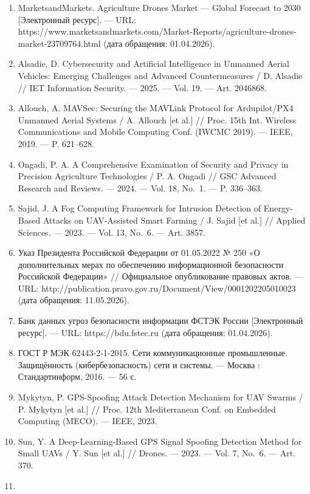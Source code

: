 \begin{enumerate}
\def\labelenumi{\arabic{enumi}.}
\item
  MarketsandMarkets. Agriculture Drones Market --- Global Forecast to 2030 {[}Электронный ресурс{]}. --- URL: https://www.marketsandmarkets.com/Market-Reports/agriculture-drones-market-23709764.html (дата обращения: 01.04.2026).
\item
  Alsadie, D. Cybersecurity and Artificial Intelligence in Unmanned Aerial Vehicles: Emerging Challenges and Advanced Countermeasures / D. Alsadie // IET Information Security. --- 2025. --- Vol. 19. --- Art. 2046868.
\item
  Allouch, A. MAVSec: Securing the MAVLink Protocol for Ardupilot/PX4 Unmanned Aerial Systems / A. Allouch {[}et al.{]} // Proc. 15th Int. Wireless Communications and Mobile Computing Conf. (IWCMC 2019). --- IEEE, 2019. --- P. 621--628.
\item
  Ongadi, P. A. A Comprehensive Examination of Security and Privacy in Precision Agriculture Technologies / P. A. Ongadi // GSC Advanced Research and Reviews. --- 2024. --- Vol. 18, No.~1. --- P. 336--363.
\item
  Sajid, J. A Fog Computing Framework for Intrusion Detection of Energy-Based Attacks on UAV-Assisted Smart Farming / J. Sajid {[}et al.{]} // Applied Sciences. --- 2023. --- Vol. 13, No.~6. --- Art. 3857.
\item
  Указ Президента Российской Федерации от 01.05.2022 № 250 «О дополнительных мерах по обеспечению информационной безопасности Российской Федерации» // Официальное опубликование правовых актов. --- URL: http://publication.pravo.gov.ru/Document/View/0001202205010023 (дата обращения: 11.05.2026).
\item
  Банк данных угроз безопасности информации ФСТЭК России {[}Электронный ресурс{]}. --- URL: https://bdu.fstec.ru (дата обращения: 01.04.2026).
\item
  ГОСТ Р МЭК 62443-2-1-2015. Сети коммуникационные промышленные. Защищённость (кибербезопасность) сети и системы. --- Москва : Стандартинформ, 2016. --- 56 с.
\item
  Mykytyn, P. GPS-Spoofing Attack Detection Mechanism for UAV Swarms / P. Mykytyn {[}et al.{]} // Proc. 12th Mediterranean Conf. on Embedded Computing (MECO). --- IEEE, 2023.
\item
  Sun, Y. A Deep-Learning-Based GPS Signal Spoofing Detection Method for Small UAVs / Y. Sun {[}et al.{]} // Drones. --- 2023. --- Vol. 7, No.~6. --- Art. 370.
\item

\end{enumerate}
